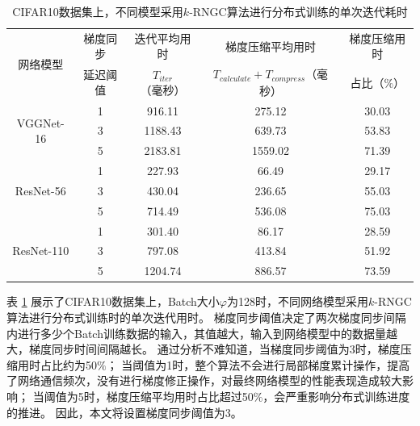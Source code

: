 \documentclass{xdupgthesis}
\begin{document}
\renewcommand{\arraystretch}{1.3}
\begin{table}[ht]
    \centering
    \begin{threeparttable}
        \caption{CIFAR10数据集上，不同模型采用$k$-RNGC算法进行分布式训练的单次迭代耗时}
        \label{tab_Result-time-contrast-2}
        \begin{tabular}{c|c|c|c|c}
            \toprule
            \toprule
            \multirow{2}{*}{网络模型} & 梯度同步 & 迭代平均用时 & 梯度压缩平均用时 & 梯度压缩用时 \\
            & 延迟阈值 & $T_{iter}$（毫秒） & $T_{calculate} + T_{compress}$（毫秒）& 占比（$\%$） \\
            \midrule
            \multirow{3}{*}{VGGNet-16} & 1 & 916.11 & 275.12 & 30.03 \\
                                        & 3 & 1188.43 & 639.73 & 53.83 \\
                                        & 5 & 2183.81 & 1559.02 & 71.39 \\
            \midrule
            \multirow{3}{*}{ResNet-56} & 1 & 227.93 & 66.49 & 29.17 \\
                                        & 3 & 430.04 & 236.65 & 55.03 \\
                                        & 5 & 714.49 & 536.08 & 75.03 \\
            \midrule
            \multirow{3}{*}{ResNet-110} & 1 & 301.40 & 86.17 & 28.59 \\
                                        & 3 & 797.08 & 413.84 & 51.92 \\
                                        & 5 & 1204.74 & 886.57 & 73.59 \\
            \bottomrule
            \bottomrule
        \end{tabular}
    \end{threeparttable}
\end{table}

表 \ref*{tab_Result-time-contrast-2} 展示了CIFAR10数据集上，Batch大小$\varphi$为128时，不同网络模型采用$k$-RNGC算法进行分布式训练时的单次迭代用时。
梯度同步阈值决定了两次梯度同步间隔内进行多少个Batch训练数据的输入，其值越大，输入到网络模型中的数据量越大，梯度同步时间间隔越长。
通过分析不难知道，当梯度同步阈值为3时，梯度压缩用时占比约为50$\%$；
当阈值为1时，整个算法不会进行局部梯度累计操作，提高了网络通信频次，没有进行梯度修正操作，对最终网络模型的性能表现造成较大影响；
当阈值为5时，梯度压缩平均用时占比超过50$\%$，会严重影响分布式训练进度的推进。
因此，本文将设置梯度同步阈值为3。
\end{document}

